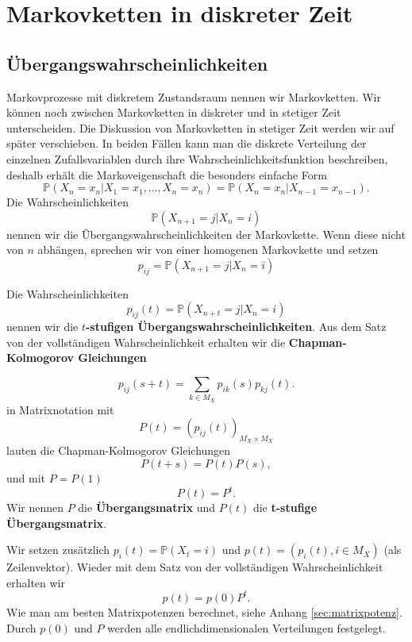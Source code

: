 \section{Markovketten in diskreter Zeit}
\subsection{Übergangswahrscheinlichkeiten}
\label{sec:uebergangswahrscheinlichkeit}
Markovprozesse mit diskretem Zustandsraum nennen wir Markovketten. Wir 
können noch zwischen Markovketten in diskreter und in stetiger Zeit
unterscheiden. Die Diskussion von Markovketten in stetiger Zeit
werden wir auf später verschieben. In beiden Fällen kann man die
diskrete Verteilung der einzelnen Zufallsvariablen durch ihre Wahrscheinlichkeitsfunktion beschreiben, deshalb erhält die Markoveigenschaft die besonders einfache Form
\[\mathbb P(X_n= x_n|X_1=x_1,\dots,X_n=x_n)=
\mathbb P(X_n=x_n|X_{n-1}=x_{n-1}).\]
Die Wahrscheinlichkeiten
\[\mathbb P(X_{n+1}=j|X_n=i)\]
nennen wir die Übergangswahrscheinlichkeiten der Markovkette. Wenn diese
nicht von $n$ abhängen, sprechen wir von einer homogenen Markovkette und
setzen
\[p_{ij}=\mathbb P(X_{n+1}=j|X_n=i)\]

\begin{definition}
Die Wahrscheinlichkeiten
\[p_{ij}(t)=\mathbb P(X_{n+t}=j|X_n=i)\]
nennen wir die \textbf{$t$-stufigen Übergangswahrscheinlichkeiten}. 
Aus dem Satz von der vollständigen Wahrscheinlichkeit erhalten wir
die \textbf{Chapman-Kolmogorov Gleichungen} 
\end{definition}
\[p_{ij}(s+t)=\sum_{k\in M_X}p_{ik}(s)p_{kj}(t).\]
in Matrixnotation mit
\[P(t)=(p_{ij}(t))_{M_X\times M_X}\]
lauten die Chapman-Kolmogorov
Gleichungen
\[P(t+s)=P(t)P(s),\]
und mit $P=P(1)$
\[P(t)=P^t.\]
Wir nennen $P$ die \textbf{Übergangsmatrix} und $P(t)$ die \textbf{t-stufige Übergangsmatrix}.

Wir setzen zusätzlich $p_i(t)=\mathbb P(X_t=i)$ und $p(t)=(p_i(t),i\in M_X)$
(als Zeilenvektor). Wieder mit dem Satz von der vollständigen Wahrscheinlichkeit erhalten wir
\[p(t)=p(0)P^t.\]
Wie man am besten Matrixpotenzen berechnet, siehe Anhang \ref{sec:matrixpotenz}.
Durch $p(0)$ und $P$ werden alle endlichdimensionalen Verteilungen festgelegt.


